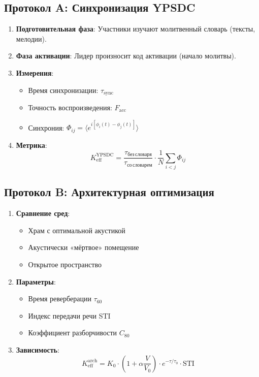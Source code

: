 \documentclass[12pt,a4paper]{article}
\begin{document}
	\subsection{Протокол A: Синхронизация YPSDC}
	
	\begin{enumerate}
		\item \textbf{Подготовительная фаза}: Участники изучают молитвенный словарь (тексты, мелодии).
		\item \textbf{Фаза активации}: Лидер произносит код активации (начало молитвы).
		\item \textbf{Измерения}:
		\begin{itemize}
			\item Время синхронизации: $\tau_{\mathrm{sync}}$
			\item Точность воспроизведения: $F_{\mathrm{acc}}$
			\item Синхрония: $\Phi_{ij} = \langle e^{i[\phi_i(t) - \phi_j(t)]} \rangle$
		\end{itemize}
		\item \textbf{Метрика}:
		\[
		K_{\mathrm{eff}}^{\mathrm{YPSDC}} = \frac{\tau_{\mathrm{без\,словаря}}}{\tau_{\mathrm{со\,словарем}}} \cdot \frac{1}{N} \sum_{i<j} \Phi_{ij}
		\]
	\end{enumerate}
	
	\subsection{Протокол B: Архитектурная оптимизация}
	
	\begin{enumerate}
		\item \textbf{Сравнение сред}:
		\begin{itemize}
			\item Храм с оптимальной акустикой
			\item Акустически «мёртвое» помещение
			\item Открытое пространство
		\end{itemize}
		\item \textbf{Параметры}:
		\begin{itemize}
			\item Время реверберации $\tau_{60}$
			\item Индекс передачи речи STI
			\item Коэффициент разборчивости $C_{80}$
		\end{itemize}
		\item \textbf{Зависимость}:
		\[
		K_{\mathrm{eff}}^{\mathrm{arch}} = K_0 \cdot \left(1 + \alpha \frac{V}{V_0}\right) \cdot e^{-\tau/\tau_0} \cdot \mathrm{STI}
		\]
	\end{enumerate}
	
\end{document}
